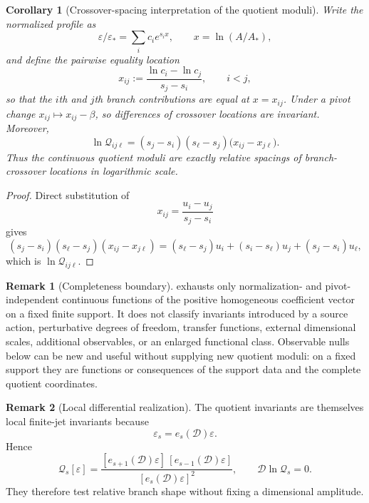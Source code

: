 \documentclass[aps,prd,preprint,onecolumn,nofootinbib,superscriptaddress,showkeys]{revtex4-2}
\numberwithin{equation}{section}
\theoremstyle{definition}
\newtheorem{remark}{Remark}[section]
\theoremstyle{plain}
\newtheorem{corollary}{Corollary}[section]
\newcommand{\Dil}{\mathscr D}
\begin{document}
\begin{corollary}[Crossover-spacing interpretation of the quotient moduli]\label{cor:crossover-moduli}
Write the normalized profile as
\[
\varepsilon/\varepsilon_*=\sum_i c_i e^{s_ix},
\qquad x=\ln(A/A_*),
\]
and define the pairwise equality location
\begin{equation}
 x_{ij}:=\frac{\ln c_i-\ln c_j}{s_j-s_i},
 \qquad i<j,
\end{equation}
so that the $i$th and $j$th branch contributions are equal at $x=x_{ij}$.  Under a pivot change $x_{ij}\mapsto x_{ij}-\beta$, so differences of crossover locations are invariant.  Moreover,
\begin{equation}
\boxed{
\ln\mathcal Q_{ij\ell}
=(s_j-s_i)(s_\ell-s_j)
\bigl(x_{ij}-x_{j\ell}\bigr).
}
\end{equation}
Thus the continuous quotient moduli are exactly relative spacings of branch-crossover locations in logarithmic scale.
\end{corollary}

\begin{proof}
Direct substitution of
\[
x_{ij}=\frac{u_i-u_j}{s_j-s_i}
\]
gives
\[
(s_j-s_i)(s_\ell-s_j)(x_{ij}-x_{j\ell})
=(s_\ell-s_j)u_i+(s_i-s_\ell)u_j+(s_j-s_i)u_\ell,
\]
which is $\ln\mathcal Q_{ij\ell}$.
\end{proof}

\begin{remark}[Completeness boundary]
 exhausts only normalization- and pivot-independent continuous functions of the positive homogeneous coefficient vector on a fixed finite support.  It does not classify invariants introduced by a source action, perturbative degrees of freedom, transfer functions, external dimensional scales, additional observables, or an enlarged functional class.  Observable nulls below can be new and useful without supplying new quotient moduli: on a fixed support they are functions or consequences of the support data and the complete quotient coordinates.
\end{remark}

\begin{remark}[Local differential realization]
The quotient invariants are themselves local finite-jet invariants because
\[
\varepsilon_s=e_s(\Dil)\varepsilon.
\]
Hence
\begin{equation}
\boxed{
\mathcal Q_s[\varepsilon]
=
\frac{
[e_{s+1}(\Dil)\varepsilon]\,[e_{s-1}(\Dil)\varepsilon]
}{
[e_s(\Dil)\varepsilon]^2
},
\qquad
\Dil\ln\mathcal Q_s=0.
}
\end{equation}
They therefore test relative branch shape without fixing a dimensional amplitude.
\end{remark}
\end{document}
